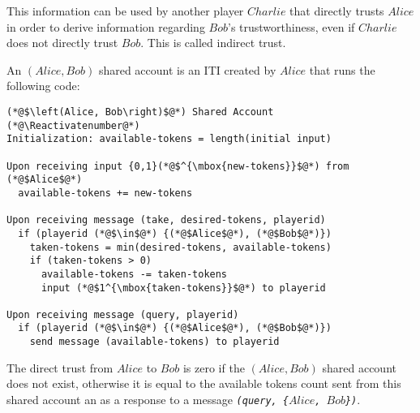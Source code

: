   This information can be used by another player $Charlie$ that directly trusts $Alice$ in order to derive information
  regarding $Bob$'s trustworthiness, even if $Charlie$ does not directly trust $Bob$. This is called indirect trust.

  \begin{definition}
    An $\left(Alice, Bob\right)$ shared account is an ITI created by $Alice$ that runs the following code:
  \end{definition}
  \Suppressnumber
  \begin{lstlisting}[label=sharedaccount, style=numbers]
(*@$\left(Alice, Bob\right)$@*) Shared Account
(*@\Reactivatenumber@*)
Initialization: available-tokens = length(initial input)

Upon receiving input {0,1}(*@$^{\mbox{new-tokens}}$@*) from (*@$Alice$@*)
  available-tokens += new-tokens

Upon receiving message (take, desired-tokens, playerid)
  if (playerid (*@$\in$@*) {(*@$Alice$@*), (*@$Bob$@*)})
    taken-tokens = min(desired-tokens, available-tokens)
    if (taken-tokens > 0)
      available-tokens -= taken-tokens
      input (*@$1^{\mbox{taken-tokens}}$@*) to playerid

Upon receiving message (query, playerid)
  if (playerid (*@$\in$@*) {(*@$Alice$@*), (*@$Bob$@*)})
    send message (available-tokens) to playerid
  \end{lstlisting}
  \begin{definition}
    The direct trust from $Alice$ to $Bob$ is zero if the $\left(Alice, Bob\right)$ shared account does not exist, otherwise it
    is equal to the available tokens count sent from this shared account an as a response to a message \emph{\texttt{(query,
    \{}$Alice$\texttt{, }$Bob$\texttt{\})}}.
  \end{definition}

